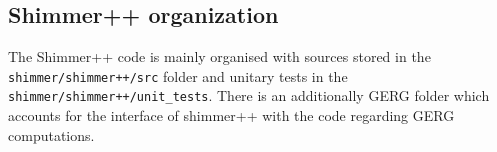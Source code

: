 \subsection{Shimmer++ organization}
The Shimmer++ code is mainly organised with sources stored in the \texttt{shimmer/shimmer++/src} folder and unitary tests in the \texttt{shimmer/shimmer++/unit\_tests}. There is an additionally GERG folder which accounts for the interface of shimmer++ with the code regarding GERG computations.



